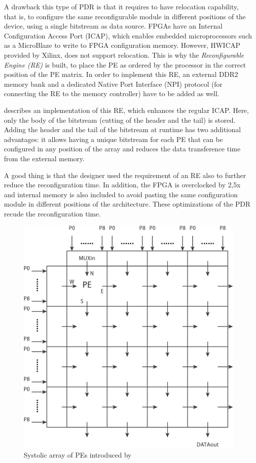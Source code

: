 A drawback this type of PDR is that it requires to have relocation capability, that is, to configure the same reconfigurable module in different positions of the device, using a single bitstream as data source. FPGAs have an Internal Configuration Access Port (ICAP), which enables embedded microprocessors such as a MicroBlaze to write to FPGA configuration memory. However, HWICAP provided by Xilinx, does not support relocation. This is why the \emph{Reconfigurable Engine (RE)} is built, to place the PE as ordered by the processor in the correct position of the PE matrix. In order to implement this RE, an external DDR2 memory bank and a dedicated Native Port Interface (NPI) protocol (for connecting the RE to the memory controller) have to be added as well.

\cite{PDR} describes an implementation of this RE, which enhances the regular ICAP. Here, only the body of the bitstream (cutting of the header and the tail) is stored. Adding the header and the tail of the bitstream at runtime has two additional advantages: it allows having a unique bitstream for each PE that can be configured in any position of the array and reduces the data transference time from the external memory. 

A good thing is that the designer used the requirement of an RE also to further reduce the reconfiguration time. In addition, the FPGA is overclocked by 2,5x and internal memory is also included to avoid pasting the same configuration module in different positions of the architecture. These optimizations of the PDR recude the reconfiguration time. 


\begin{figure}[htb]%
\includegraphics[width=\columnwidth]{Pictures/PE}%
\caption{Systolic array of PEs introduced by \cite{PDR}}%
\label{fig:pe}%
\end{figure}

